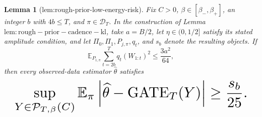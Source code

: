 \documentclass{article}
\newtheorem{lemma}{Lemma}
\begin{document}
\begin{lemma}[lem:rough-prior-low-energy-risk]\label{lem:rough-prior-low-energy-risk}
Fix \(C>0\), \(\beta\in[\beta_-,\beta_+]\), an integer \(b\) with \(4b\le T\), and \(\pi\in\mathcal D_T\). In the construction of Lemma~\(\mathrm{lem:rough-prior-cadence-kl}\), take \(a=B/2\), let \(\eta\in(0,1/2]\) satisfy its stated amplitude condition, and let \(\Pi_0,\Pi_1,P_{j,\pi},q_t\), and \(s_b\) denote the resulting objects. If
\[
\mathbb E_{P_{1,\pi}}\sum_{t=2b}^T q_t(W_{1:t})^2\le \frac{3a^2}{64},
\]
then every observed-data estimator \(\widehat\theta\) satisfies
\[
\makebox[\linewidth][c]{\resizebox{0.98\linewidth}{!}{\leavevmode\par\noindent \makebox[\linewidth][c]{\resizebox{0.98\linewidth}{!}{\(\displaystyle \displaystyle \sup_{Y\in\mathcal P_{T,\beta}(C)}\mathbb E_\pi\left|\widehat\theta-\operatorname{GATE}_T(Y)\right|\ge \frac{s_b}{25}.\)}}\par\noindent}}
\]
\end{lemma}
\end{document}
